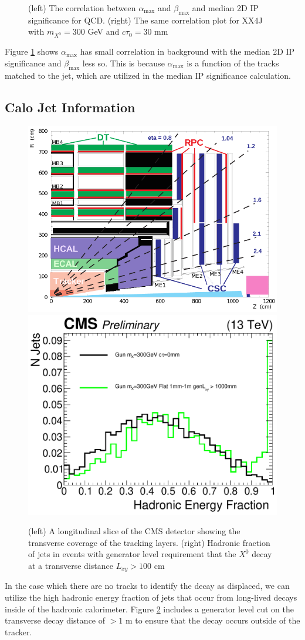 \begin{figure}
\begin{center}
\end{center}
\caption{(left) The correlation between $\alpha_{\textrm{max}}$ and $\beta_{\textrm{max}}$ and median 2D IP significance for QCD. (right) 
The same correlation plot for XX4J with $m_{X^0}=300$ GeV and $c\tau_0 = 30$ mm}
\label{fig:2d_alpha_beta_ipsig}
\end{figure}
Figure \ref{fig:2d_alpha_beta_ipsig} shows $\alpha_{\textrm{max}}$ has small correlation in background with the median 2D IP significance
and $\beta_{\textrm{max}}$ less so. This is because $\alpha_{\textrm{max}}$ is a function of the tracks matched to the jet, 
which are utilized in the median IP significance calculation. 
\subsection{Calo Jet Information}
\begin{figure}
\begin{center}
\includegraphics[width=.45\textwidth]{figures/an_jetid/DIAGRAMS/cms_slice}
\includegraphics[width=.45\textwidth]{figures/an_jetid/VTX_MATCH_IP/GUN_hadronicFraction}
\end{center}
\caption{(left) A longitudinal slice of the CMS detector showing the transverse coverage of the tracking layers. (right) Hadronic fraction of jets in events with generator level requirement that the $X^{0}$ decay at a transverse distance $L_{xy} > 100$ cm}
\label{fig:hadronicFraction}
\end{figure}
In the case which there are no tracks to identify the decay as 
displaced, we can utilize the high hadronic energy fraction
of jets that occur from long-lived decays inside of the hadronic calorimeter. 
Figure \ref{fig:hadronicFraction} includes a generator level
cut on the transverse decay distance of $>1$ m to ensure that the decay occurs outside of the tracker.
